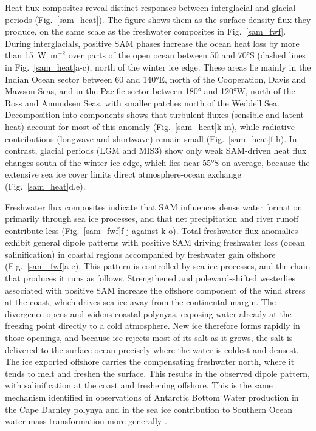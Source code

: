 \documentclass[pdflatex,sn-nature]{sn-jnl}
\begin{document}
Heat flux composites reveal distinct responses between interglacial and glacial periods (Fig.~\ref{sam_heat}). The figure shows them as the surface density flux they produce, on the same scale as the freshwater composites in Fig.~\ref{sam_fwf}. During interglacials, positive SAM phases increase the ocean heat loss by more than 15~W~m$^{-2}$ over parts of the open ocean between 50 and 70°S (dashed lines in Fig.~\ref{sam_heat}a-c), north of the winter ice edge. These areas lie mainly in the Indian Ocean sector between 60 and 140°E, north of the Cooperation, Davis and Mawson Seas, and in the Pacific sector between 180° and 120°W, north of the Ross and Amundsen Seas, with smaller patches north of the Weddell Sea. Decomposition into components shows that turbulent fluxes (sensible and latent heat) account for most of this anomaly (Fig.~\ref{sam_heat}k-m), while radiative contributions (longwave and shortwave) remain small (Fig.~\ref{sam_heat}f-h). In contrast, glacial periods (LGM and MIS3) show only weak SAM-driven heat flux changes south of the winter ice edge, which lies near 55°S on average, because the extensive sea ice cover limits direct atmosphere-ocean exchange (Fig.~\ref{sam_heat}d,e).


Freshwater flux composites indicate that SAM influences dense water formation primarily through sea ice processes, and that net precipitation and river runoff contribute less (Fig.~\ref{sam_fwf}f-j against k-o). Total freshwater flux anomalies exhibit general dipole patterns with positive SAM driving freshwater loss (ocean salinification) in coastal regions accompanied by freshwater gain offshore (Fig.~\ref{sam_fwf}a-e). This pattern is controlled by sea ice processes, and the chain that produces it runs as follows. Strengthened and poleward-shifted westerlies associated with positive SAM increase the offshore component of the wind stress at the coast, which drives sea ice away from the continental margin. The divergence opens and widens coastal polynyas, exposing water already at the freezing point directly to a cold atmosphere. New ice therefore forms rapidly in those openings, and because ice rejects most of its salt as it grows, the salt is delivered to the surface ocean precisely where the water is coldest and densest. The ice exported offshore carries the compensating freshwater north, where it tends to melt and freshen the surface. This results in the observed dipole pattern, with salinification at the coast and freshening offshore. This is the same mechanism identified in observations of Antarctic Bottom Water production in the Cape Darnley polynya \cite{Ohshima2013} and in the sea ice contribution to Southern Ocean water mass transformation more generally \cite{Abernathey2016}.
\end{document}
